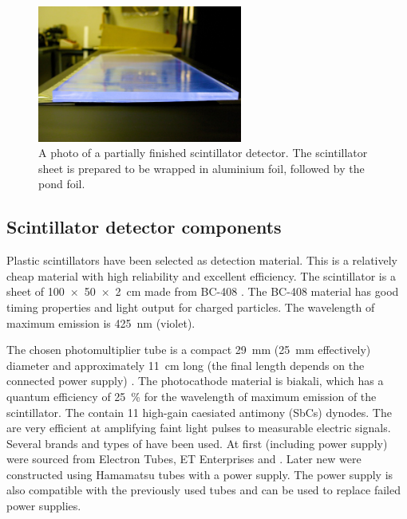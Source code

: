 \begin{figure}
    \centering
    \includegraphics[width=0.6\textwidth]
                    {plots/station/ADL_115651.jpg}
    \caption{A photo of a partially finished scintillator detector. The scintillator sheet is prepared to be wrapped in aluminium foil, followed by the pond foil.}
    \label{fig:scintillator_detector}
\end{figure}


\subsection{Scintillator detector components}

Plastic scintillators have been selected as detection material. This is a relatively cheap material with high reliability and excellent efficiency. The scintillator is a sheet of \SI[product-units=power]{100 x 50 x 2}{\centi\meter} made from BC-408 \cite{sgc2011bc408}. The BC-408 material has good timing properties and light output for charged particles. The wavelength of maximum emission is \SI{425}{\nano\meter} (violet).

The chosen photomultiplier tube \cite{et2010pmt,hamamatsu2014pmt} is a compact \SI{29}{\milli\meter} (\SI{25}{\milli\meter} effectively) diameter and approximately \SI{11}{\centi\meter} long (the final length depends on the connected power supply) \pmt. The photocathode material is biakali, which has a quantum efficiency of \SI{25}{\percent} for the wavelength of maximum emission of the scintillator. The \pmts contain 11 high-gain caesiated antimony (SbCs) dynodes. The \pmts are very efficient at amplifying faint light pulses to measurable electric signals. Several brands and types of \pmts have been used. At first \pmts (including power supply) were sourced from Electron Tubes, ET Enterprises and \senstech. Later new \pmts were constructed using Hamamatsu tubes with a \nikhef power supply. The \nikhef \pmt power supply is also compatible with the previously used tubes and can be used to replace failed power supplies.

